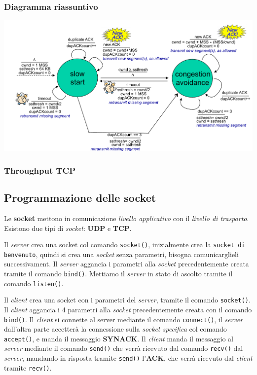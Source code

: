 \subsubsection*{Diagramma riassuntivo}
\includegraphics[width=\textwidth]{./img/diagrammacontrollodicongestione.png} \\

\subsubsection{Throughput TCP}

\subsection{Programmazione delle socket}
Le \textbf{socket} mettono in comunicazione \textit{livello applicativo} con il \textit{livello di trasporto}. 
Esistono due tipi di \textit{socket}: \textbf{UDP} e \textbf{TCP}. 

Il \textit{server} crea una socket col comando \texttt{socket()}, inizialmente crea la \texttt{socket di benvenuto}, quindi si crea una \textit{socket} senza parametri, bisogna comunicarglieli successivament.
Il \textit{server} aggancia i parametri alla \textit{socket} precedentemente creata tramite il comando \texttt{bind()}. Mettiamo il \textit{server} in stato di ascolto tramite il comando \texttt{listen()}. 

Il \textit{client} crea una socket con i parametri del \textit{server}, tramite il comando \texttt{socket()}. 
Il \textit{client} aggancia i 4 parametri alla \textit{socket} precedentemente creata con il comando \texttt{bind()}. 
Il \textit{client} si connette al server mediante il comando \texttt{connect()}, il \textit{server} dall'altra parte accetterà la connessione sulla \textit{socket specifica} col comando \texttt{accept()}, e manda il messaggio \textbf{SYNACK}.
Il \textit{client} manda il messaggio al \textit{server} mediante il comando \texttt{send()} che verrà ricevuto dal comando \texttt{recv()} dal \textit{server}, mandando in risposta tramite \texttt{send()} l'\textbf{ACK}, che verrà ricevuto dal \textit{client} tramite \texttt{recv()}. 

